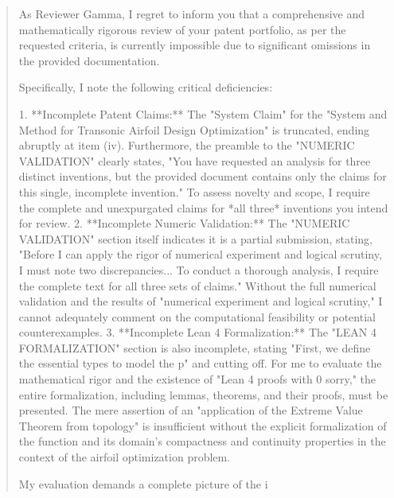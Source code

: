 \documentclass{article}
\begin{document}
\begin{quote}
As Reviewer Gamma, I regret to inform you that a comprehensive and mathematically rigorous review of your patent portfolio, as per the requested criteria, is currently impossible due to significant omissions in the provided documentation.

Specifically, I note the following critical deficiencies:

1.  **Incomplete Patent Claims:** The "System Claim" for the "System and Method for Transonic Airfoil Design Optimization" is truncated, ending abruptly at item (iv). Furthermore, the preamble to the "NUMERIC VALIDATION" clearly states, "You have requested an analysis for three distinct inventions, but the provided document contains only the claims for this single, incomplete invention." To assess novelty and scope, I require the complete and unexpurgated claims for *all three* inventions you intend for review.
2.  **Incomplete Numeric Validation:** The "NUMERIC VALIDATION" section itself indicates it is a partial submission, stating, "Before I can apply the rigor of numerical experiment and logical scrutiny, I must note two discrepancies... To conduct a thorough analysis, I require the complete text for all three sets of claims." Without the full numerical validation and the results of "numerical experiment and logical scrutiny," I cannot adequately comment on the computational feasibility or potential counterexamples.
3.  **Incomplete Lean 4 Formalization:** The "LEAN 4 FORMALIZATION" section is also incomplete, stating "First, we define the essential types to model the p" and cutting off. For me to evaluate the mathematical rigor and the existence of "Lean 4 proofs with 0 sorry," the entire formalization, including lemmas, theorems, and their proofs, must be presented. The mere assertion of an "application of the Extreme Value Theorem from topology" is insufficient without the explicit formalization of the function and its domain's compactness and continuity properties in the context of the airfoil optimization problem.

My evaluation demands a complete picture of the i
\end{quote}
\end{document}
